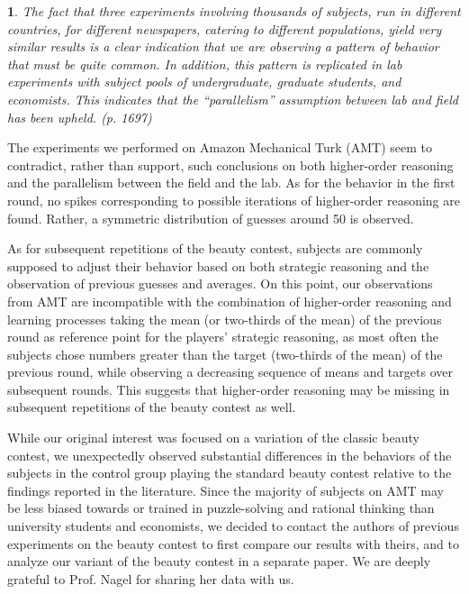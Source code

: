 \documentclass[12pt,review]{elsarticle}
\newtheorem{fact}[thm]{\protect\factname}
\providecommand{\factname}{Fact}
\begin{document}
\begin{fact}
\label{fact:parallelism}The fact that three experiments involving
thousands of subjects, run in different countries, for different newspapers,
catering to different populations, yield very similar results is a
clear indication that we are observing a pattern of behavior that
must be quite common. In addition, this pattern is replicated in lab
experiments with subject pools of undergraduate, graduate students,
and economists. This indicates that the \textquotedblleft parallelism\textquotedblright{}
assumption between lab and field has been upheld. (p. 1697) 
\end{fact}

The experiments we performed on Amazon Mechanical Turk (AMT) seem
to contradict, rather than support, such conclusions on both higher-order
reasoning and the parallelism between the field and the lab. As for
the behavior in the first round, no spikes corresponding to possible
iterations of higher-order reasoning are found. Rather, a symmetric
distribution of guesses around 50 is observed.

As for subsequent repetitions of the beauty contest, subjects are
commonly supposed to adjust their behavior based on both strategic
reasoning and the observation of previous guesses and averages. On
this point, our observations from AMT are incompatible with the combination
of higher-order reasoning and learning processes taking the mean (or
two-thirds of the mean) of the previous round as reference point for
the players' strategic reasoning, as most often the subjects chose
numbers greater than the target (two-thirds of the mean) of the previous
round, while observing a decreasing sequence of means and targets
over subsequent rounds. This suggests that higher-order reasoning
may be missing in subsequent repetitions of the beauty contest as
well.

While our original interest was focused on a variation of the classic
beauty contest, we unexpectedly observed substantial differences in
the behaviors of the subjects in the control group playing the standard
beauty contest relative to the findings reported in the literature.
Since the majority of subjects on AMT may be less biased towards or
trained in puzzle-solving and rational thinking than university students
and economists, we decided to contact the authors of previous experiments
on the beauty contest to first compare our results with theirs, and
to analyze our variant of the beauty contest in a separate paper.
We are deeply grateful to Prof. Nagel for sharing her data with us.
\end{document}
